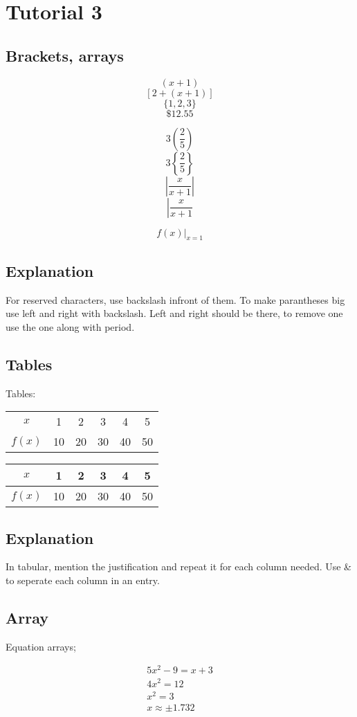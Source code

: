 \documentclass[11pt]{article}
\begin{document}
\section*{Tutorial 3}
\subsection{Brackets, arrays}

$$(x+1)$$
$$[2+(x+1)]$$
$$\{1,2,3\}$$
$$\$12.55$$

$$3\left(\frac{2}{5}\right)$$
$$3\left\{\frac{2}{5}\right\}$$
$$\left|\frac{x}{x+1}\right|$$
$$\left|\frac{x}{x+1}\right.$$

$$\left.f(x)\right|_{x=1}$$


\subsection*{Explanation}
For reserved characters, use backslash infront of them. To make parantheses big use left and right with backslash. Left and right should be there, to remove one use the one along with period.

\subsection{Tables}
Tables:

\begin{tabular}{cccccc}
$x$ & 1 & 2 & 3 & 4 & 5 \\
$f(x)$ & 10 & 20 & 30 & 40 & 50
\end{tabular}

\begin{tabular}{|c|c|c|c|c|c|}
\hline
$x$ & 1 & 2 & 3 & 4 & 5 \\ \hline
$f(x)$ & 10 & 20 & 30 & 40 & 50 \\
\hline
\end{tabular}

\subsection*{Explanation}
In tabular, mention the justification and repeat it for each column needed.
Use \& to seperate each column in an entry.

\subsection{Array}
Equation arrays;


\begin{eqnarray}
5x^2 - 9= x +3 \\
4x^2 = 12 \\
x^2=3 \\
x \approx \pm 1.732 \\
\end{eqnarray}
\end{document}
